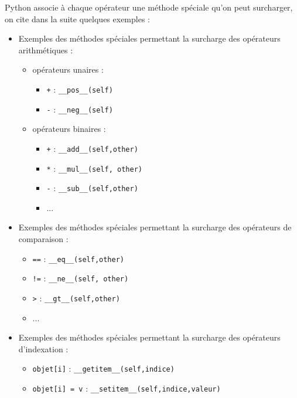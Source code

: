 \documentclass[%
oneside,                 %
final,                   %
10pt]{article}
\begin{document}
Python associe à chaque opérateur une méthode spéciale qu'on peut surcharger, on cite dans la suite quelques
exemples :
\begin{itemize}
\item Exemples des méthodes spéciales permettant la surcharge des opérateurs arithmétiques :
\begin{itemize}

 \item opérateurs unaires :
\begin{itemize}

  \item \texttt{+} : \Verb!__pos__(self)!

  \item \texttt{-} : \Verb!__neg__(self)!

\end{itemize}

\noindent
 \item opérateurs binaires :
\begin{itemize}

  \item \texttt{+} : \Verb!__add__(self,other)!

  \item \texttt{*} : \Verb!__mul__(self, other)!

  \item \texttt{-} : \Verb!__sub__(self,other)!

  \item ...

\end{itemize}

\noindent
\end{itemize}

\noindent
\item Exemples des méthodes spéciales permettant la surcharge des opérateurs de comparaison :
\begin{itemize}

 \item \texttt{==} : \Verb!__eq__(self,other)!

 \item \Verb?!=? : \Verb!__ne__(self, other)!

 \item \texttt{>} : \Verb!__gt__(self,other)!

 \item ...

\end{itemize}

\noindent
\item Exemples des méthodes spéciales permettant la surcharge des opérateurs d'indexation :
\begin{itemize}

 \item \texttt{objet[i]} : \Verb!__getitem__(self,indice)!

 \item \texttt{objet[i] = v} : \Verb!__setitem__(self,indice,valeur)!
\end{itemize}

\noindent
\end{itemize}
\end{document}
